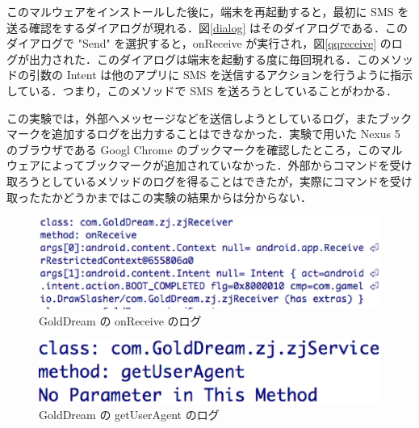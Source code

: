 \begin{enumerate}
	このマルウェアをインストールした後に，端末を再起動すると，最初に SMS を送る確認をするダイアログが現れる．図\ref{dialog} はそのダイアログである．このダイアログで "Send" を選択すると，onReceive が実行され，図\ref{qqreceive} のログが出力された．このダイアログは端末を起動する度に毎回現れる．このメソッドの引数の Intent は他のアプリに SMS を送信するアクションを行うように指示している．つまり，このメソッドで SMS を送ろうとしていることがわかる．
	
	この実験では，外部へメッセージなどを送信しようとしているログ，またブックマークを追加するログを出力することはできなかった．実験で用いた Nexus 5 のブラウザである Googl Chrome のブックマークを確認したところ，このマルウェアによってブックマークが追加されていなかった．外部からコマンドを受け取ろうとしているメソッドのログを得ることはできたが，実際にコマンドを受け取ったたかどうかまではこの実験の結果からは分からない．
\end{enumerate}


\begin{figure}[t]
\begin{center}
\graphicspath{{./epsfiles/}}
\includegraphics[scale=0.5]{onreceivezjservice.eps}
\end{center}
\caption{GoldDream の onReceive のログ}
\label{zjservicereceive}
\end{figure}

\begin{figure}[t]
\begin{center}
\graphicspath{{./epsfiles/}}
\includegraphics[scale=0.3]{getuseragentzjservice.eps}
\end{center}
\caption{GoldDream の getUserAgent のログ}
\label{zjserviceuseragent}
\end{figure}

